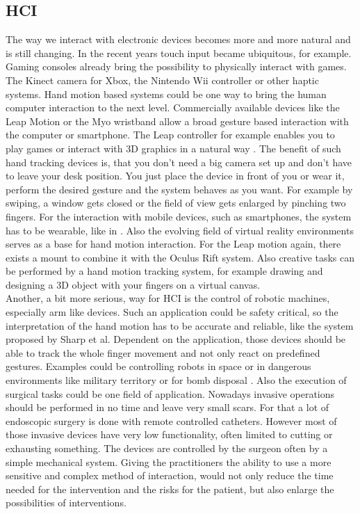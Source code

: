 \subsection{\ac{HCI}} \label{subsec:applications:HCI}
The way we interact with electronic devices becomes more and more natural and is still changing. In the recent years touch input became ubiquitous, for example. Gaming consoles already bring the possibility to physically interact with games. The Kinect camera for Xbox, the Nintendo Wii controller or other haptic systems. Hand motion based systems could be one way to bring the human computer interaction to the next level. Commercially available devices like the Leap Motion or the Myo wristband allow a broad gesture based interaction with the computer or smartphone. The Leap controller for example enables you to play games or interact with 3D graphics in a natural way \cite{leap}. The benefit of such hand tracking devices is, that you don't need a big camera set up and don't have to leave your desk position. You just place the device in front of you or wear it, perform the desired gesture and the system behaves as you want. For example by swiping, a window gets closed or the field of view gets enlarged by pinching two fingers. For the interaction with mobile devices, such as smartphones, the system has to be wearable, like in \cite{Digits}. Also the evolving field of virtual reality environments serves as a base for hand motion interaction. For the Leap motion again, there exists a mount to combine it with the Oculus Rift system. Also creative tasks can be performed by a hand motion tracking system, for example drawing and designing a 3D object with your fingers on a virtual canvas.\\
Another, a bit more serious, way for \ac{HCI} is the control of robotic machines, especially arm like devices. Such an application could be safety critical, so the interpretation of the hand motion has to be accurate and reliable, like the system proposed by Sharp et al. Dependent on the application, those devices should be able to track the whole finger movement and not only react on predefined gestures. Examples could be controlling robots in space \cite{dipietro2008survey} or in dangerous environments like military territory or for bomb disposal \cite{greenleaf1996developing}. Also the execution of surgical tasks could be one field of application. Nowadays invasive operations should be performed in no time and leave very small scars. For that a lot of endoscopic surgery is done with remote controlled catheters. However most of those invasive devices have very low functionality, often limited to cutting or exhausting something. The devices are controlled by the surgeon often by a simple mechanical system. Giving the practitioners the ability to use a more sensitive and complex method of interaction, would not only reduce the time needed for the intervention and the risks for the patient, but also enlarge the possibilities of interventions.\\


